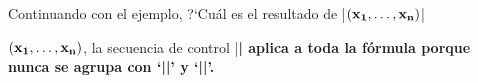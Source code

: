 


\bigskip

\enunciadoS Continuando con el ejemplo, ?`Cu\'al es el resultado de
|$\row{\bf x}$|

\bigskip

\respuestaS
\def\row#1{(#1_1,\ldots,#1_n)}

$\row{\bf x}$, la secuencia de control |\bf| aplica a toda la
f\'ormula porque nunca se agrupa con `|{|' y `|}|'.

\bye

